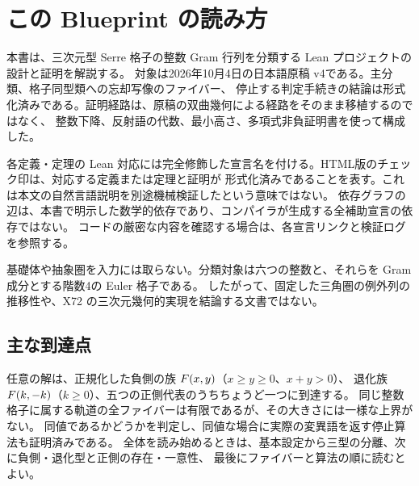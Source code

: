 \section*{この Blueprint の読み方}
本書は、三次元型 Serre 格子の整数 Gram 行列を分類する Lean プロジェクトの設計と証明を解説する。
対象は2026年10月4日の日本語原稿 v4である。主分類、格子同型類への忘却写像のファイバー、
停止する判定手続きの結論は形式化済みである。証明経路は、原稿の双曲幾何による経路をそのまま移植するのではなく、
整数下降、反射語の代数、最小高さ、多項式非負証明書を使って構成した。

各定義・定理の Lean 対応には完全修飾した宣言名を付ける。HTML版のチェック印は、対応する定義または定理と証明が
形式化済みであることを表す。これは本文の自然言語説明を別途機械検証したという意味ではない。
依存グラフの辺は、本書で明示した数学的依存であり、コンパイラが生成する全補助宣言の依存ではない。
コードの厳密な内容を確認する場合は、各宣言リンクと検証ログを参照する。

基礎体や抽象圏を入力には取らない。分類対象は六つの整数と、それらを Gram 成分とする階数4の Euler 格子である。
したがって、固定した三角圏の例外列の推移性や、X72 の三次元幾何的実現を結論する文書ではない。

\subsection*{主な到達点}
任意の解は、正規化した負側の族 $F(x,y)$（$x\ge y\ge0$、$x+y>0$）、
退化族 $F(k,-k)$（$k\ge0$）、五つの正側代表のうちちょうど一つに到達する。
同じ整数格子に属する軌道の全ファイバーは有限であるが、その大きさには一様な上界がない。
同値であるかどうかを判定し、同値な場合に実際の変異語を返す停止算法も証明済みである。
全体を読み始めるときは、基本設定から三型の分離、次に負側・退化型と正側の存在・一意性、
最後にファイバーと算法の順に読むとよい。

\depview
\tableofcontents





